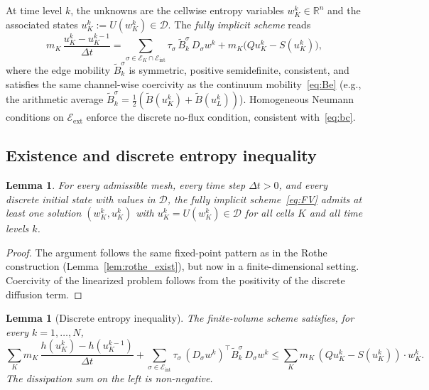 \documentclass{article}
\newtheorem{lemma}[theorem]{Lemma}
\newcommand{\R}{\mathbb{R}}
\newcommand{\D}{\mathcal{D}}
\newcommand{\Be}{\widetilde{B}}       %
\begin{document}
At time level $k$, the unknowns are the cellwise entropy variables
$w^k_K\in\R^n$ and the associated states $u^k_K:=U(w^k_K)\in\D$. The
\emph{fully implicit scheme} reads
\begin{equation}\label{eq:FV}
  m_K\,\frac{u^k_K-u^{k-1}_K}{\Delta t}
  = \sum_{\sigma\in\mathcal{E}_K\cap\mathcal{E}_{\mathrm{int}}}
    \tau_\sigma\,\Be^\sigma_k\,D_\sigma w^k
  + m_K\bigl(Qu^k_K-S(u^k_K)\bigr),
\end{equation}
where the edge mobility $\Be^\sigma_k$ is symmetric, positive
semidefinite, consistent, and satisfies the same channel-wise coercivity
as the continuum mobility~\eqref{eq:Be} (e.g., the arithmetic average
$\Be^\sigma_k = \frac{1}{2}(\Be(u^k_K)+\Be(u^k_L))$).
Homogeneous Neumann conditions on $\mathcal{E}_{\mathrm{ext}}$ enforce
the discrete no-flux condition, consistent with~\eqref{eq:bc}.

\subsection{Existence and discrete entropy inequality}

\begin{lemma}\label{lem:FV_exist}
For every admissible mesh, every time step $\Delta t>0$, and every
discrete initial state with values in $\D$, the fully implicit
scheme~\eqref{eq:FV} admits at least one solution $(w^k_K,u^k_K)$ with
$u^k_K=U(w^k_K)\in\D$ for all cells $K$ and all time levels $k$.
\end{lemma}

\begin{proof}
The argument follows the same fixed-point pattern as in the Rothe
construction (Lemma~\ref{lem:rothe_exist}), but now in a
finite-dimensional setting. Coercivity of the linearized problem
follows from the positivity of the discrete diffusion term.
\end{proof}

\begin{lemma}[Discrete entropy inequality]\label{lem:FV_entropy}
The finite-volume scheme satisfies, for every $k=1,\dots,N$,
\begin{equation}\label{eq:FV_entropy}
  \sum_K m_K\,\frac{h(u^k_K)-h(u^{k-1}_K)}{\Delta t}
  + \sum_{\sigma\in\mathcal{E}_{\mathrm{int}}}
    \tau_\sigma\,(D_\sigma w^k)^\top\Be^\sigma_k\,D_\sigma w^k
  \le \sum_K m_K\,(Qu^k_K-S(u^k_K))\cdot w^k_K.
\end{equation}
The dissipation sum on the left is non-negative.
\end{lemma}
\end{document}
